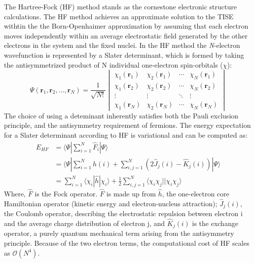 The Hartree-Fock (HF) method stands as the cornestone electronic structure calculations\cite{szabo1996modern}. The HF method achieves an approximate solution to the TISE withtin the the Born-Openhaimer approximation by assuming that each electron moves independently within an average electrostatic field generated by the other electrons in the system and the fixed nuclei. In the HF method the \textit{N}-electron wavefunction is represented by a Slater determinant, which is formed by taking the antisymmetrized product of N individual one-electron spin-orbitals ($\chi$):
\begin{equation}\label{eq:SlaterDet}
    \Psi(\mathbf{r}_1, \mathbf{r}_2, \dots, \mathbf{r}_N) = \frac{1}{\sqrt{N!}}
    \begin{vmatrix}
      \chi_1(\mathbf{r}_1) & \chi_2(\mathbf{r}_1) & \cdots & \chi_N(\mathbf{r}_1) \\
      \chi_1(\mathbf{r}_2) & \chi_2(\mathbf{r}_2) & \cdots & \chi_N(\mathbf{r}_2) \\
      \vdots & \vdots & \ddots & \vdots \\
      \chi_1(\mathbf{r}_N) & \chi_2(\mathbf{r}_N) & \cdots & \chi_N(\mathbf{r}_N)
    \end{vmatrix}
  \end{equation}
The choice of using a deteminant inherently satisfies both the Pauli exclusion principle, and the antisymmetry requirement of fermions. The energy expectation for a Slater determinant according to HF is variational and can be computed as:
\begin{equation}\label{EHF}
    \begin{aligned}
        E_{HF} &= \langle \Psi | \sum_{i=1}^{N} \hat{F}_i  | \Psi \rangle \\
            &= \langle \Psi | \sum_{i=1}^{N} \hat{h}(i) + \sum_{i,j=1}^{N} (2\hat{J}_j(i) - \hat{K}_j(i)) | \Psi \rangle\\ 
            &= \sum_{i=1}^{N} \langle \chi_i | \hat{h} | \chi_i \rangle + \frac{1}{2} \sum_{i,j=1}^{N} \langle \chi_i \chi_j || \chi_i \chi_j \rangle
    \end{aligned}
\end{equation}
Where, $\hat{F}$ is the Fock operator. $\hat{F}$ is made up from $\hat{h}$, the one-electron core Hamiltonian operator (kinetic energy and electron-nucleus attraction); $\hat{J}_j(i)$, the Coulomb operator, describing the electrostatic repulsion between electron i and the average charge distribution of electron j, and $\hat{K}_j(i)$ is the exchange operator, a purely quantum mechanical term arising from the antisymmetry principle. Because of the two electron terms, the computational cost of HF scales as $\mathcal{O}(N^4)$. \\
